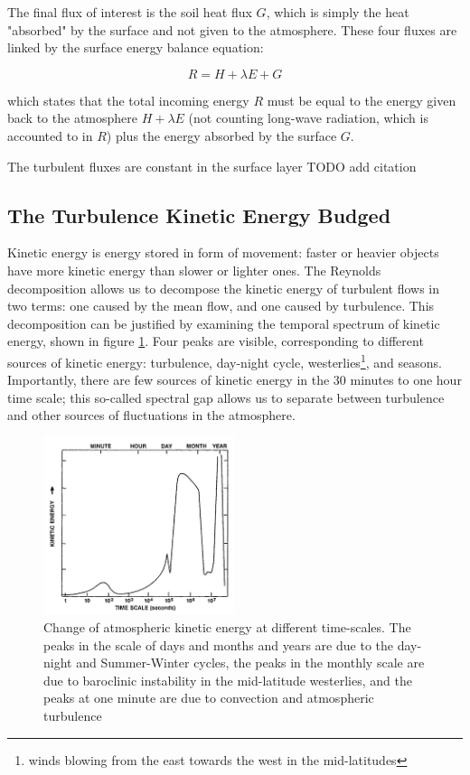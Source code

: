 \documentclass[12pt]{book}
\begin{document}
The final flux of interest is the soil heat flux $G$, which is simply the heat "absorbed" by the surface and not given to the atmosphere. These four fluxes are linked by the surface energy balance equation:

$$
R=H+\lambda E+G
$$

which states that the total incoming energy $R$ must be equal to the energy given back to the atmosphere $H+\lambda E$ (not counting long-wave radiation, which is accounted to in $R$) plus the energy absorbed by the surface $G$.

The turbulent fluxes are constant in the surface layer TODO add citation

\subsection{The Turbulence Kinetic Energy Budged}
Kinetic energy is energy stored in form of movement: faster or heavier objects have more kinetic energy than slower or lighter ones. The Reynolds decomposition allows us to decompose the kinetic energy of turbulent flows in two terms: one caused by the mean flow, and one caused by turbulence. This decomposition can be justified by examining the temporal spectrum of kinetic energy, shown in figure \ref{fig:tkespectrum}. Four peaks are visible, corresponding to different sources of kinetic energy: turbulence, day-night cycle, westerlies\footnote{winds blowing from the east towards the west in the mid-latitudes}, and seasons. Importantly, there are few sources of kinetic energy in the 30 minutes to one hour time scale; this so-called spectral gap allows us to separate between turbulence and other sources of fluctuations in the atmosphere.

\begin{figure}
\caption{Change of atmospheric kinetic energy at different time-scales. The peaks in the scale of days and months and years are due to the day-night and Summer-Winter cycles, the peaks in the monthly scale are due to baroclinic instability in the mid-latitude westerlies, and the peaks at one minute are due to convection and atmospheric turbulence \cite{tkespectrumsrc,tkespectrumorig}}
\label{fig:tkespectrum}
\centering
\includegraphics[width=0.5\textwidth]{images/kinetic_energy_spectrum}
\end{figure}
\end{document}

